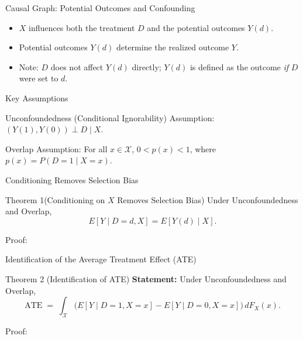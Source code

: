 \documentclass[xcolor=svgnames,t]{beamer}
\begin{document}
\begin{frame}{Causal Graph: Potential Outcomes and Confounding}
\centering
{}

\medskip
\begin{itemize}
    \item $X$ influences both the treatment $D$ and the potential outcomes $Y(d)$.
    \item Potential outcomes $Y(d)$ determine the realized outcome $Y$.
    \item Note: $D$ does not affect $Y(d)$ directly; $Y(d)$ is defined as the outcome \emph{if} $D$ were set to $d$.
\end{itemize}
\end{frame}


\begin{frame}{Key Assumptions}
\begin{block}{Unconfoundedness (Conditional Ignorability)}
Assumption: $(Y(1), Y(0)) \perp D \mid X$.

\end{block}
\pause
\vspace{20pt}
\begin{block}{Overlap}
Assumption: For all $x \in \mathcal{X}$, $0 < p(x) < 1$, where $p(x) = P(D=1 \mid X=x)$.

\end{block}
\end{frame}


\begin{frame}{Conditioning Removes Selection Bias}
\begin{block}{Theorem 1(Conditioning on $X$ Removes Selection Bias)}
Under Unconfoundedness and Overlap,
\[
E[Y \mid D=d, X] = E[Y(d) \mid X].
\]


\end{block}

Proof: %
\end{frame}


\begin{frame}{Identification of the Average Treatment Effect (ATE)}
\begin{block}{Theorem 2 (Identification of ATE)}
\textbf{Statement:} Under Unconfoundedness and Overlap,
\[
\text{ATE} \;=\; \int_{\mathcal{X}} \bigl( E[Y \mid D=1, X=x] - E[Y \mid D=0, X=x] \bigr) \, dF_X(x).
\]


\end{block}

Proof:
\end{frame}
\end{document}

